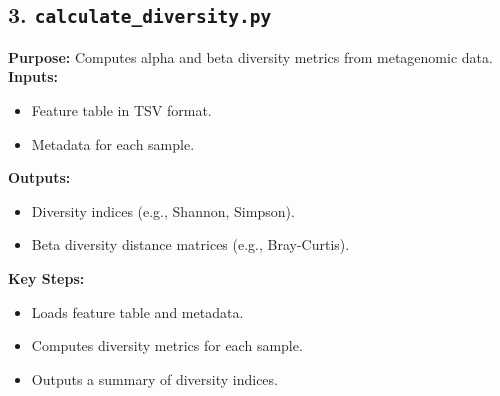 \documentclass[11pt]{article}
\begin{document}
\subsection*{3. \texttt{calculate\_diversity.py}}
\textbf{Purpose:} Computes alpha and beta diversity metrics from metagenomic data. \\
\textbf{Inputs:}
\begin{itemize}
	\item Feature table in TSV format.
	\item Metadata for each sample.
\end{itemize}
\textbf{Outputs:}
\begin{itemize}
	\item Diversity indices (e.g., Shannon, Simpson).
	\item Beta diversity distance matrices (e.g., Bray-Curtis).
\end{itemize}
\textbf{Key Steps:}
\begin{itemize}
	\item Loads feature table and metadata.
	\item Computes diversity metrics for each sample.
	\item Outputs a summary of diversity indices.
\end{itemize}

\end{document}
